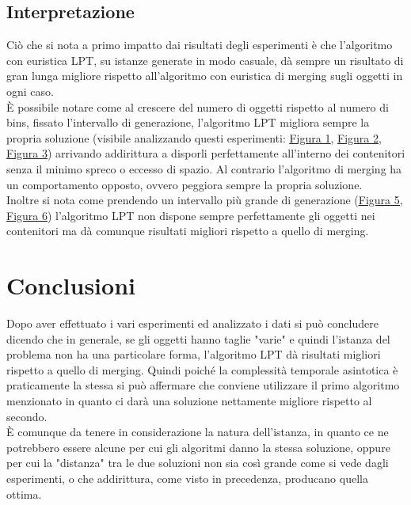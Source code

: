 \subsection{Interpretazione}
Ciò che si nota a primo impatto dai risultati degli esperimenti è che l'algoritmo con euristica LPT, su istanze generate in modo casuale, dà sempre un risultato
di gran lunga migliore rispetto all'algoritmo con euristica di merging sugli oggetti in ogni caso.\\
È possibile notare come al crescere del numero di oggetti rispetto al numero di bins, fissato l'intervallo di generazione, l'algoritmo LPT migliora sempre la 
propria soluzione (visibile analizzando questi esperimenti: \hyperref[sec:Exp1]{\underline{Figura 1}}, \hyperref[sec:Exp2]{\underline{Figura 2}}, 
\hyperref[sec:Exp3]{\underline{Figura 3}}) arrivando addirittura a disporli perfettamente all'interno dei contenitori senza il minimo spreco o eccesso di spazio. Al
contrario l'algoritmo di merging ha un comportamento opposto, ovvero peggiora sempre la propria soluzione.\\
Inoltre si nota come prendendo un intervallo più grande di generazione (\hyperref[sec:Exp5]{\underline{Figura 5}}, \hyperref[sec:Exp6]{\underline{Figura 6}}) 
l'algoritmo LPT non dispone sempre perfettamente gli oggetti nei contenitori ma dà comunque risultati migliori rispetto a quello di merging.


\section{Conclusioni}
Dopo aver effettuato i vari esperimenti ed analizzato i dati si può concludere dicendo che in generale, se gli oggetti hanno taglie "varie" e quindi l'istanza del problema
non ha una particolare forma, l'algoritmo LPT dà risultati migliori rispetto a quello di merging. Quindi poiché la complessità temporale asintotica è praticamente
la stessa si può affermare che conviene utilizzare il primo algoritmo menzionato in quanto ci darà una soluzione nettamente migliore rispetto al secondo.\\
È comunque da tenere in considerazione la natura dell'istanza, in quanto ce ne potrebbero essere alcune per cui gli algoritmi danno la stessa soluzione, oppure per cui la
"distanza" tra le due soluzioni non sia così grande come si vede dagli esperimenti, o che addirittura, come visto in precedenza, producano quella ottima.